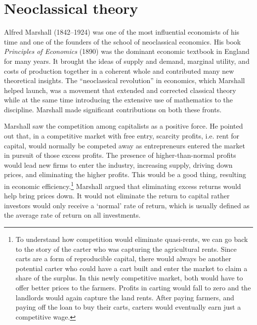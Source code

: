 
\section{Neoclassical theory }

Alfred Marshall (1842--1924) was one of the most influential economists of his time and one of the founders of the school of neoclassical economics. His book \textit{Principles of Economics} (1890) \cite{marshallPrinciplesEconomics1890} was the dominant economic textbook in England for many years. It brought the ideas of supply and demand, marginal utility, and costs of production together in a coherent whole and contributed many new theoretical insights. 
The ``neoclassical revolution'' in economics, which Marshall helped launch, was a movement that extended and corrected classical theory while at the same time introducing the extensive use of mathematics to the discipline. Marshall made significant contributions on both these fronts. 

Marshall saw the competition among capitalists as a positive force.  
He pointed out that, in a competitive market with \gls{free entry}, {scarcity profits}, i.e. rent for capital, would normally be competed away as entrepreneurs entered the market in pursuit of those \gls{excess profits}. The presence of higher-than-normal profits would lead new firms to enter the industry, increasing supply, driving down prices, and eliminating the higher profits.  This would be a good thing, resulting in economic efficiency.\footnote{To understand how competition would eliminate quasi-rents, we can go back to the story of the carter who was capturing the agricultural rents. Since carts are a form of reproducible capital, there would always be another potential carter who could have a cart built and enter the market to claim a share of the surplus. In this newly competitive market, both would have to offer better prices to the farmers. Profits in carting would fall to zero and the landlords would again capture the land rents. After paying farmers, and paying off the loan to buy their carts, carters would eventually earn just a competitive wage.} Marshall argued that eliminating  excess returns would help bring prices down. It would not eliminate the return to capital rather investors would only receive a `normal'  rate of return, which is usually defined as the average rate of return on all investments.

